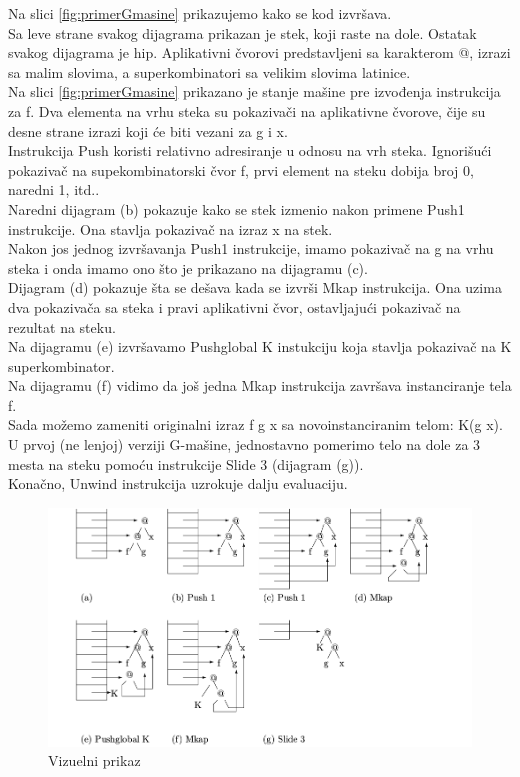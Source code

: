 Na slici \ref{fig:primerGmasine} prikazujemo kako se kod izvršava.\\
Sa leve strane svakog dijagrama prikazan je stek, koji raste na dole. Ostatak svakog dijagrama je hip. Aplikativni čvorovi predstavljeni sa karakterom @, izrazi sa malim slovima, a superkombinatori sa velikim slovima latinice.\\ 
Na slici \ref{fig:primerGmasine} prikazano je stanje mašine pre izvođenja instrukcija za f. Dva elementa na vrhu steka su pokazivači na aplikativne čvorove, čije su desne strane izrazi koji će biti vezani za g i x.\\ 
Instrukcija Push koristi relativno adresiranje u odnosu na vrh steka. Ignorišući pokazivač na supekombinatorski čvor f, prvi element na steku dobija broj 0, naredni 1, itd..\\ 
Naredni dijagram (b) pokazuje kako se stek izmenio nakon primene Push1 instrukcije. Ona stavlja pokazivač na izraz x na stek. \\ Nakon jos jednog izvršavanja Push1 instrukcije, imamo pokazivač na g na vrhu steka i onda imamo ono što je prikazano na dijagramu (c). \\ Dijagram (d) pokazuje šta se dešava kada se izvrši Mkap instrukcija. Ona uzima dva pokazivača sa steka i pravi aplikativni čvor, ostavljajući pokazivač na rezultat na steku. \\ Na dijagramu (e) izvršavamo Pushglobal K instukciju koja stavlja pokazivač na K superkombinator. \\ Na dijagramu (f) vidimo da još jedna Mkap instrukcija završava instanciranje tela f.\\ 
Sada možemo zameniti originalni izraz f g x  sa novoinstanciranim telom: K(g x). U prvoj (ne lenjoj) verziji G-mašine, jednostavno pomerimo telo na dole za 3 mesta na steku pomoću instrukcije Slide 3 (dijagram (g)).\\ Konačno, Unwind instrukcija uzrokuje dalju evaluaciju.\\
\begin{figure}[h!]
\begin{center}
\includegraphics[scale=0.35]{primerGmasine.png}
\end{center}
\caption{Vizuelni prikaz}
\label{fig:gcompiler}
\end{figure}
